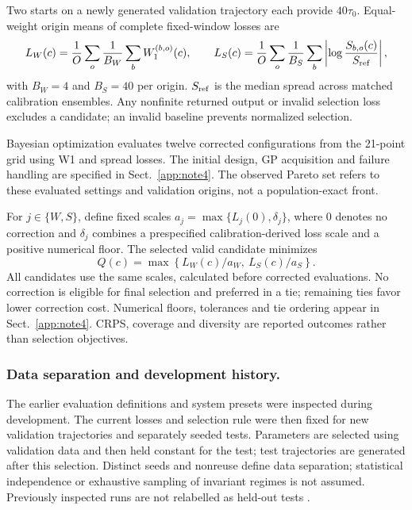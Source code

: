 \documentclass[gmd,manuscript]{copernicus}
\begin{document}
Two starts on a newly generated validation trajectory each provide $40\tau_0$. Equal-weight origin means of complete fixed-window losses are
\begin{equation}
L_W(c)=\frac1O\sum_o\frac1{B_W}\sum_b W_1^{(b,o)}(c),\qquad
L_S(c)=\frac1O\sum_o\frac1{B_S}\sum_b\left|\log\frac{S_{b,o}(c)}{S_{\rm ref}}\right|,
\end{equation}
with $B_W=4$ and $B_S=40$ per origin. $S_{\rm ref}$ is the median spread across matched calibration ensembles. Any nonfinite returned output or invalid selection loss excludes a candidate; an invalid baseline prevents normalized selection.

Bayesian optimization evaluates twelve corrected configurations from the 21-point grid using W1 and spread losses. The initial design, GP acquisition and failure handling are specified in Sect.~\ref{app:note4}. The observed Pareto set refers to these evaluated settings and validation origins, not a population-exact front.

For $j\in\{W,S\}$, define fixed scales $a_j=\max\{L_j(0),\delta_j\}$, where $0$ denotes no correction and $\delta_j$ combines a prespecified calibration-derived loss scale and a positive numerical floor. The selected valid candidate minimizes
\begin{equation}
Q(c)=\max\left\{L_W(c)/a_W,\ L_S(c)/a_S\right\}.
\end{equation}
All candidates use the same scales, calculated before corrected evaluations. No correction is eligible for final selection and preferred in a tie; remaining ties favor lower correction cost. Numerical floors, tolerances and tie ordering appear in Sect.~\ref{app:note4}. CRPS, coverage and diversity are reported outcomes rather than selection objectives.

\subsubsection{Data separation and development history.}
The earlier evaluation definitions and system presets were inspected during development. The current losses and selection rule were then fixed for new validation trajectories and separately seeded tests. Parameters are selected using validation data and then held constant for the test; test trajectories are generated after this selection. Distinct seeds and nonreuse define data separation; statistical independence or exhaustive sampling of invariant regimes is not assumed. Previously inspected runs are not relabelled as held-out tests \citep{cawley2010overfitting}.
\end{document}
